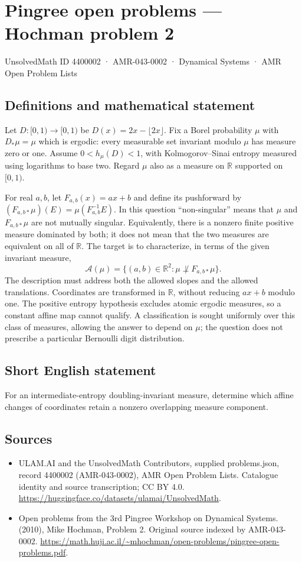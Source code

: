\documentclass[11pt,a4paper]{article}
\begin{document}
\section*{Pingree open problems — Hochman problem 2}\label{4400002}
{\small UnsolvedMath ID 4400002 · AMR-043-0002 · Dynamical Systems · AMR Open Problem Lists}
\subsection{Definitions and mathematical statement}
Let $D:[0,1)\to[0,1)$ be $D(x)=2x-\lfloor2x\rfloor$. Fix a Borel probability
$\mu$ with $D_*\mu=\mu$ which is ergodic: every measurable set invariant
modulo $\mu$ has measure zero or one. Assume
$0<h_\mu(D)<1$, with Kolmogorov--Sinai entropy measured using logarithms
to base two. Regard $\mu$ also as a measure on $\mathbb R$ supported on $[0,1)$.

For real $a,b$, let $F_{a,b}(x)=ax+b$ and define its pushforward by
$(F_{a,b*}\mu)(E)=\mu(F_{a,b}^{-1}E)$. In this question ``non-singular''
means that $\mu$ and $F_{a,b*}\mu$ are not mutually singular. Equivalently,
there is a nonzero finite positive measure dominated by both; it does not
mean that the two measures are equivalent on all of $\mathbb R$.
The target is to characterize, in terms of the given invariant measure,
\[
 \mathcal A(\mu)=\{(a,b)\in\mathbb R^2:
                   \mu\not\perp F_{a,b*}\mu\}.
\]
The description must address both the allowed slopes and the allowed
translations. Coordinates are transformed in $\mathbb R$, without reducing
$ax+b$ modulo one. The positive entropy hypothesis excludes atomic ergodic
measures, so a constant affine map cannot qualify. A classification is sought
uniformly over this class of measures, allowing the answer to depend on $\mu$;
the question does not prescribe a particular Bernoulli digit distribution.
\subsection{Short English statement}
For an intermediate-entropy doubling-invariant measure, determine which affine changes of coordinates retain a nonzero overlapping measure component.
\subsection{Sources}
\begin{itemize}
\item[S1] ULAM.AI and the UnsolvedMath Contributors, supplied problems.json, record 4400002 (AMR-043-0002), AMR Open Problem Lists. Catalogue identity and source transcription; CC BY 4.0.
\url{https://huggingface.co/datasets/ulamai/UnsolvedMath}.
\item[S2] Open problems from the 3rd Pingree Workshop on Dynamical Systems. (2010), Mike Hochman, Problem 2. Original source indexed by AMR-043-0002.
\url{https://math.huji.ac.il/~mhochman/open-problems/pingree-open-problems.pdf}.
\end{itemize}
\end{document}
